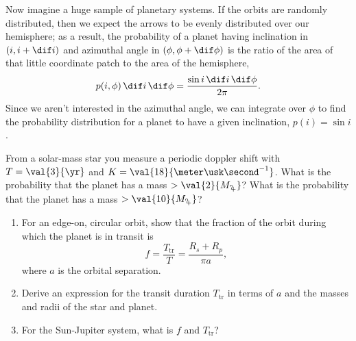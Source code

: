 Now imagine a huge sample of planetary systems.  If the orbits are randomly distributed, then we expect the arrows to be evenly distributed over our hemisphere; as a result, the probability of a planet having inclination in $(i,i+\dif i)$ and azimuthal angle in $(\phi,\phi+\dif\phi)$ is the ratio of the area of that little coordinate patch to the area of the hemisphere,
\[ p(i,\phi)\,\dif i\,\dif \phi = \frac{\sin i\,\dif i\,\dif\phi}{2\pi}. \]
Since we aren't interested in the azimuthal angle, we can integrate over $\phi$ to find the probability distribution for a planet to have a given inclination, $p(i) = \sin i$.


\begin{exercisebox}
From a solar-mass star you measure a periodic doppler shift with $T = \val{3}{\yr}$ and $K = \val{18}{\meter\usk\second^{-1}}$.  What is the probability that the planet has a mass $>\val{2}{M_{\jupiter}}$? What is the probability that the planet has a mass $>\val{10}{M_{\jupiter}}$?
\end{exercisebox}

\begin{exercisebox}
\begin{enumerate}\renewcommand{\labelenumi}{\alph{enumi})}
\item\label{e.transit-fraction}
For an edge-on, circular orbit, show that the fraction of the orbit during which the planet is in transit is
\[ f = \frac{T_{\mathrm{tr}}}{T} = \frac{R_{s}+R_{p}}{\pi a}, \]
where $a$ is the orbital separation.

\item\label{e.transit-duration}
Derive an expression for the transit duration $T_{\mathrm{tr}}$ in terms of $a$ and the masses and radii of the star and planet.

\item\label{e.transit-properties-jupiter}
For the Sun-Jupiter system, what is $f$ and $T_{\mathrm{tr}}$?

\end{enumerate}
\end{exercisebox}

